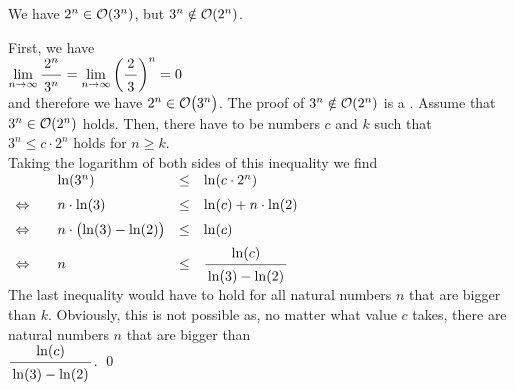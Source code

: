\example
We have $2^n \in \mathcal{O}(3^n)$, but  $3^n \notin \mathcal{O}(2^n)$.
\ex

\proof
 First, we have \\[0.2cm]
\hspace*{1.3cm} 
$\displaystyle\lim\limits_{n \rightarrow \infty} \bruch{2^n}{3^n} = 
 \lim\limits_{n \rightarrow \infty} \left(\bruch{2}{3}\right)^n = 0$
\\[0.2cm]
and therefore we have $2^n \in \mathcal{O}\bigl(3^n\bigr)$.  The proof of $3^n \notin \mathcal{O}(2^n)$ is a 
.  Assume that 
$3^n \in \mathcal{O}(2^n)$ holds.  Then, there have to be numbers $c$ and $k$ such that 
\\[0.2cm]
\hspace*{1.3cm}
$3^n \leq c \cdot 2^n$ \quad holds for $n \geq k$. 
\\[0.2cm]
Taking the logarithm of both sides of this inequality we find 
\\[0.2cm]
\hspace*{1.3cm}
$
\begin{array}{llcl}
                & \ln(3^n) & \leq & \ln(c \cdot 2^n) \\[0.2cm]
\Leftrightarrow\quad &  n \cdot \ln(3) & \leq & \ln(c) + n \cdot \ln(2) \\[0.2cm]
\Leftrightarrow &  n \cdot \bigl(\ln(3) - \ln(2)\bigr) & \leq & \ln(c)  \\[0.2cm]
\Leftrightarrow &  n  & \leq & \bruch{\ln(c)}{\ln(3) - \ln(2)}          \\[0.2cm]
\end{array}
$
\\[0.2cm]
The last inequality would have to hold for all natural numbers $n$ that are bigger than $k$.  Obviously,
this is not possible as, no matter what value $c$ takes, there are natural numbers $n$ that are bigger than 
\\[0.2cm]
\hspace*{1.3cm}
$\bruch{\ln(c)}{\ln(3) - \ln(2)}$.
\qed

